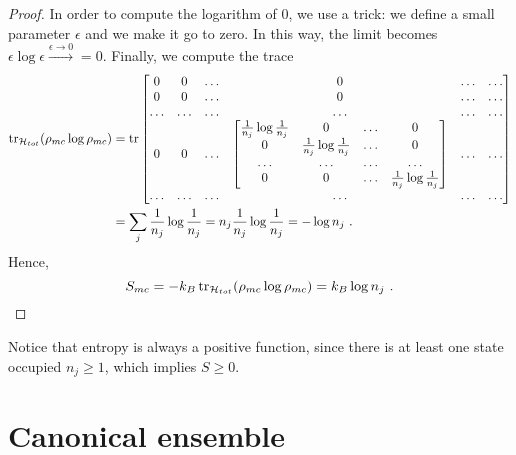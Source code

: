 \begin{proof}
        In order to compute the logarithm of $0$, we use a trick: we define a small parameter $\epsilon$ and we make it go to zero. In this way, the limit becomes $\epsilon \log \epsilon \xrightarrow{\epsilon \rightarrow 0} = 0$. Finally, we compute the trace 
        \begin{equation*}
        \begin{aligned}
            \operatorname{tr}_{\mathcal H_{tot}} ( \rho_{mc} \log \rho_{mc}) & = \operatorname{tr} \begin{bmatrix}
                0 & 0 & \ldots & 0 & \ldots & \ldots \\ 
                0 & 0 & \ldots & 0 & \ldots & \ldots \\ 
                \ldots & \ldots & \ldots & \ldots & \ldots & \ldots \\
                0 & 0 & \ldots & \begin{bmatrix}
                    \frac{1}{n_j} \log \frac{1}{n_j} & 0 & \ldots & 0 \\
                    0 & \frac{1}{n_j} \log \frac{1}{n_j} & \ldots & 0 \\
                    \ldots & \ldots & \ldots & \ldots \\
                    0 & 0 & \ldots & \frac{1}{n_j} \log \frac{1}{n_j} \\
                \end{bmatrix} & \ldots & \ldots \\
                \ldots & \ldots & \ldots & \ldots & \ldots & \ldots \\
            \end{bmatrix} \\ & = \sum_j \frac{1}{n_j} \log \frac{1}{n_j} = n_j \frac{1}{n_j} \log \frac{1}{n_j} = - \log n_j ~.
        \end{aligned}
        \end{equation*}
        Hence, 
        \begin{equation*}
            S_{mc} = - k_B \operatorname{tr}_{\mathcal H_{tot}} ( \rho_{mc} \log \rho_{mc}) = k_B \log n_j ~.
        \end{equation*}
    \end{proof}

    Notice that entropy is always a positive function, since there is at least one state occupied $n_j \geq 1$, which implies $S \geq 0$.

\chapter{Canonical ensemble}

